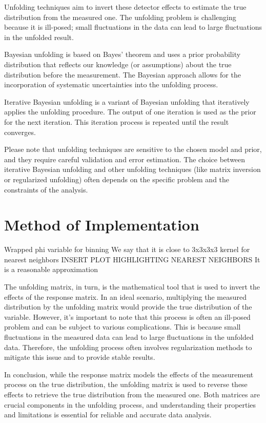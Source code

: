     Unfolding techniques aim to invert these detector effects to estimate the true distribution from the measured one. The unfolding problem is challenging because it is ill-posed; small fluctuations in the data can lead to large fluctuations in the unfolded result.
    
    Bayesian unfolding is based on Bayes' theorem and uses a prior probability distribution that reflects our knowledge (or assumptions) about the true distribution before the measurement. The Bayesian approach allows for the incorporation of systematic uncertainties into the unfolding process.
    
    Iterative Bayesian unfolding is a variant of Bayesian unfolding that iteratively applies the unfolding procedure. The output of one iteration is used as the prior for the next iteration. This iteration process is repeated until the result converges.
    
    Please note that unfolding techniques are sensitive to the chosen model and prior, and they require careful validation and error estimation. The choice between iterative Bayesian unfolding and other unfolding techniques (like matrix inversion or regularized unfolding) often depends on the specific problem and the constraints of the analysis.

\section{Method of Implementation}

    Wrapped phi variable for binning
    We say that it is close to 3x3x3x3 kernel for nearest neighbors
    INSERT PLOT HIGHLIGHTING NEAREST NEIGHBORS
    It is a reasonable approximation

    


    The unfolding matrix, in turn, is the mathematical tool that is used to invert the effects of the response matrix. In an ideal scenario, multiplying the measured distribution by the unfolding matrix would provide the true distribution of the variable. However, it's important to note that this process is often an ill-posed problem and can be subject to various complications. This is because small fluctuations in the measured data can lead to large fluctuations in the unfolded data. Therefore, the unfolding process often involves regularization methods to mitigate this issue and to provide stable results.
    
    In conclusion, while the response matrix models the effects of the measurement process on the true distribution, the unfolding matrix is used to reverse these effects to retrieve the true distribution from the measured one. Both matrices are crucial components in the unfolding process, and understanding their properties and limitations is essential for reliable and accurate data analysis.
        
